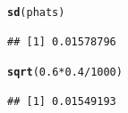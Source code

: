 \documentclass[fleqn, 11pt]{article}\usepackage[]{graphicx}\usepackage[]{color}
\makeatletter
\newcommand{\hlnum}[1]{\textcolor[rgb]{0.686,0.059,0.569}{#1}}%
\newcommand{\hlopt}[1]{\textcolor[rgb]{0,0,0}{#1}}%
\newcommand{\hlstd}[1]{\textcolor[rgb]{0.345,0.345,0.345}{#1}}%
\newcommand{\hlkwd}[1]{\textcolor[rgb]{0.737,0.353,0.396}{\textbf{#1}}}%
\newenvironment{kframe}{%
 \def\at@end@of@kframe{}%
 \ifinner\ifhmode%
  \def\at@end@of@kframe{\end{minipage}}%
  \begin{minipage}{\columnwidth}%
 \fi\fi%
 \def\FrameCommand##1{\hskip\@totalleftmargin \hskip-\fboxsep
 \colorbox{shadecolor}{##1}\hskip-\fboxsep
     \hskip-\linewidth \hskip-\@totalleftmargin \hskip\columnwidth}%
 \MakeFramed {\advance\hsize-\width
   \@totalleftmargin\z@ \linewidth\hsize
   \@setminipage}}%
 {\par\unskip\endMakeFramed%
 \at@end@of@kframe}
\newenvironment{knitrout}{}{} %
\makeatother
\begin{document}
\begin{knitrout}
\color{fgcolor}\begin{kframe}
\begin{alltt}
\hlkwd{sd}\hlstd{(phats)}
\end{alltt}
\begin{verbatim}
## [1] 0.01578796
\end{verbatim}
\begin{alltt}
\hlkwd{sqrt}\hlstd{(}\hlnum{0.6} \hlopt{*} \hlnum{0.4} \hlopt{/} \hlnum{1000}\hlstd{)}
\end{alltt}
\begin{verbatim}
## [1] 0.01549193
\end{verbatim}
\end{kframe}
\end{knitrout}
\end{document}

